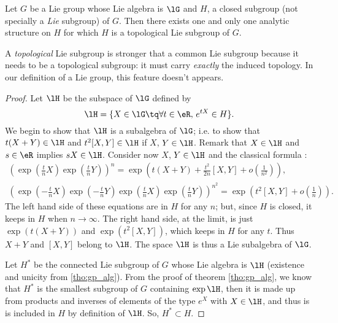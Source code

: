 \begin{theorem}  
Let $G$ be a Lie group whose Lie algebra is $\lG$ and $H$, a closed subgroup (not specially a \emph{Lie} subgroup) of $G$. Then there exists one and only one analytic structure on $H$ for which $H$ is a topological Lie subgroup of $G$.
\label{tho:diff_sur_ferme}
\end{theorem}

\begin{remark}
A \textit{topological} Lie subgroup is stronger that a common Lie subgroup because it needs to be a topological subgroup: it must carry \emph{exactly} the induced topology. In our definition of a Lie group, this feature doesn't appears. 
\end{remark}

\begin{proof}
   Let $\lH$ be the subspace of $\lG$ defined by 
\begin{equation}\label{eq:lH_de_G}
  \lH=\{X\in\lG\tq \forall t\in\eR,\, e^{tX}\in H\}.
\end{equation}
We begin to show that $\lH$ is a subalgebra of $\lG$; i.e. to show that $t(X+Y)\in\lH$ and $t^2[X,Y]\in\lH$ if $X$, $Y\in\lH$. Remark that $X\in\lH$ and $s\in\eR$ implies $sX\in\lH$. Consider now $X$, $Y\in\lH$ and the classical formula :
\begin{subequations}
\begin{align}
\left(  \exp(\frac{t}{n}X)\exp(\frac{t}{n}Y)  \right )^n
                       =\exp( t(X+Y)+\frac{t^2}{2n}[X,Y]+o(\frac{1}{n^2}) ),\\
\left(  \exp(-\frac{t}{n}X)\exp(-\frac{t}{n}Y)\exp(\frac{t}{n}X)\exp(\frac{t}{n}Y)   \right)^{n^2}
                       =\exp\left( t^2[X,Y]+o(\frac{1}{n})\right).
\end{align}
\end{subequations}
The left hand side of these equations are in $H$ for any $n$; but, since $H$ is closed, it keeps in $H$ when $n\to\infty$. The right hand side, at the limit, is just $\exp(t(X+Y))$ and $\exp(t^2[X,Y])$, which keeps in $H$ for any $t$. Thus $X+Y$ and $[X,Y]$ belong to $\lH$. The space $\lH$ is thus a Lie subalgebra of $\lG$.

Let $H^*$ be the connected Lie subgroup of $G$ whose Lie algebra is $\lH$ (existence and unicity from \ref{tho:gp_alg}). From the proof of theorem \ref{tho:gp_alg}, we know that $H^*$ is the smallest subgroup of $G$ containing $\exp\lH$, then it is made up from products and inverses of elements of the type $e^X$ with $X\in\lH$, and thus is is included in $H$ by definition of $\lH$. So, $H^*\subset H$.
  

\end{proof}
